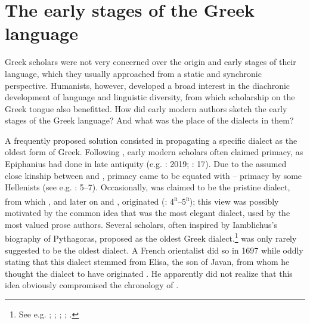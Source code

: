 \section{The early stages of the Greek language}\label{sec:5.4}\largerpage

Greek scholars were not very concerned over the origin and early stages of their language, which they usually approached from a static and synchronic perspective. Humanists, however, developed a broad interest in the diachronic development of language and linguistic diversity, from which scholarship on the Greek tongue also benefitted. How did early modern authors sketch the early stages of the Greek language? And what was the place of the dialects in them?

A frequently proposed solution consisted in propagating a specific dialect as the oldest form of Greek. Following , early modern scholars often claimed  primacy, as Epiphanius had done in late antiquity (e.g. \citealt{Alsted1630}: 2019; \citealt{Von1705}: 17). Due to the assumed close kinship between  and ,  primacy came to be equated with – primacy by some Hellenists (see e.g. \citealt{Schmidt1604}: 5–7). Occasionally,  was claimed to be the pristine dialect, from which , and later on  and , originated (\citealt{Baile1588}: 4\textsc{\textsuperscript{r}}–5\textsc{\textsuperscript{r}}); this view was possibly motivated by the common idea that  was the most elegant dialect, used by the most valued prose authors. Several scholars, often inspired by Iamblichus’s biography of Pythagoras, proposed  as the oldest Greek dialect.\footnote{See e.g. \citet[860]{Goropius1569}; \citet[29]{Burton1657}; \citet[118]{Mazzocchi1754}; \citet[\textsc{iv}]{Facius1782}; \citet[21]{Gedike1782}.}  was only rarely suggested to be the oldest dialect. A French orientalist did so in 1697 while oddly stating that this dialect stemmed from Elisa, the son of Javan, from whom he thought the  dialect to have originated \citep[110]{Thomassin1697}. He apparently did not realize that this idea obviously compromised the chronology of .

